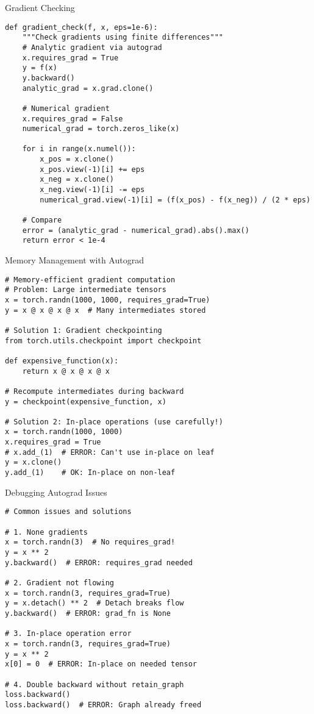 \documentclass[aspectratio=169,10pt]{beamer}
\begin{document}
\begin{frame}[fragile]{Gradient Checking}
\begin{lstlisting}
def gradient_check(f, x, eps=1e-6):
    """Check gradients using finite differences"""
    # Analytic gradient via autograd
    x.requires_grad = True
    y = f(x)
    y.backward()
    analytic_grad = x.grad.clone()
    
    # Numerical gradient
    x.requires_grad = False
    numerical_grad = torch.zeros_like(x)
    
    for i in range(x.numel()):
        x_pos = x.clone()
        x_pos.view(-1)[i] += eps
        x_neg = x.clone()
        x_neg.view(-1)[i] -= eps
        numerical_grad.view(-1)[i] = (f(x_pos) - f(x_neg)) / (2 * eps)
    
    # Compare
    error = (analytic_grad - numerical_grad).abs().max()
    return error < 1e-4
\end{lstlisting}
\end{frame}

\begin{frame}[fragile]{Memory Management with Autograd}
\begin{lstlisting}
# Memory-efficient gradient computation
# Problem: Large intermediate tensors
x = torch.randn(1000, 1000, requires_grad=True)
y = x @ x @ x @ x  # Many intermediates stored

# Solution 1: Gradient checkpointing
from torch.utils.checkpoint import checkpoint

def expensive_function(x):
    return x @ x @ x @ x

# Recompute intermediates during backward
y = checkpoint(expensive_function, x)

# Solution 2: In-place operations (use carefully!)
x = torch.randn(1000, 1000)
x.requires_grad = True
# x.add_(1)  # ERROR: Can't use in-place on leaf
y = x.clone()
y.add_(1)    # OK: In-place on non-leaf
\end{lstlisting}
\end{frame}

\begin{frame}[fragile]{Debugging Autograd Issues}
\begin{lstlisting}
# Common issues and solutions

# 1. None gradients
x = torch.randn(3)  # No requires_grad!
y = x ** 2
y.backward()  # ERROR: requires_grad needed

# 2. Gradient not flowing
x = torch.randn(3, requires_grad=True)
y = x.detach() ** 2  # Detach breaks flow
y.backward()  # ERROR: grad_fn is None

# 3. In-place operation error
x = torch.randn(3, requires_grad=True)
y = x ** 2
x[0] = 0  # ERROR: In-place on needed tensor

# 4. Double backward without retain_graph
loss.backward()
loss.backward()  # ERROR: Graph already freed
\end{lstlisting}
\end{frame}
\end{document}
